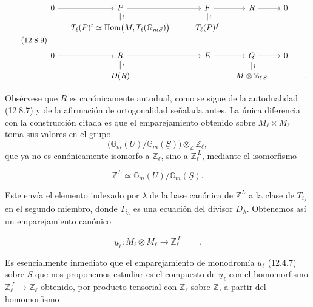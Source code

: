 
\begin{equation}\tag{12.8.9}
\begin{tikzcd}[row sep=small,column sep=small]
0 \arrow[r] & P \arrow[rr] \arrow[d,dash,"\wr"]
 & & F \arrow[r] \arrow[d,dash,"\wr"] & R \arrow[r] & 0 & \\
& T_\ell(P)^t\simeq
  \underline{\operatorname{Hom}}
    \bigl(M,T_\ell(\sisi{\underline{\mathbb G}}{\mathbb G}_{m\underline S})\sisi{}{\bigr)}
& & T_\ell(P)^f & & & \\
& & & & & & \\
0 \arrow[r] & R \arrow[rr] \arrow[d,dash,"\wr"]
& & E \arrow[r] & Q \arrow[r] \arrow[d,dash,"\wr"] & 0 & \\
& D(R) & & & M\otimes\mathbb Z_{\ell\,\underline S} & & .
\end{tikzcd}
\end{equation}

\noindent
Obsérvese que $R$ es canónicamente autodual, como se sigue de la
autodualidad (12.8.7) y de la afirmación de ortogonalidad señalada antes.
La única diferencia con la construcción citada es que el emparejamiento
obtenido sobre $M_\ell\times M_\ell$ toma sus valores en el grupo
\[
 \bigl(\mathbb G_m(U)/\mathbb G_m(\underline S)\bigr)
 \otimes_{\mathbb Z}\mathbb Z_\ell,
\]
que ya no es canónicamente isomorfo a $\mathbb Z_\ell$, sino a
$\mathbb Z_\ell^{\,L}$, mediante el isomorfismo

\begin{equation}\tag{12.8.10}
 \mathbb Z^L\simeq
 \mathbb G_m(U)/\mathbb G_m(\underline S).
\end{equation}

\noindent
Este envía el elemento indexado por $\lambda$ de la base canónica de
$\mathbb Z^L$ a la clase de $T_{i_\lambda}$ en el segundo miembro, donde
$T_{i_\lambda}$ es una ecuación del divisor $D_\lambda$. Obtenemos así
un emparejamiento canónico

\begin{equation}\tag{12.8.11}
 \underline{u}_\ell:M_\ell\otimes M_\ell
 \longrightarrow\mathbb Z_\ell^{\,L}\qquad .
\end{equation}

\noindent
Es esencialmente inmediato que el emparejamiento de monodromía $u_\ell$
(12.4.7) sobre $S$ que nos proponemos estudiar es el compuesto de
$\underline{u}_\ell$ con el homomorfismo
$\mathbb Z_\ell^{\,L}\longrightarrow\mathbb Z_\ell$ obtenido, por
producto tensorial con $\mathbb Z_\ell$ sobre $\mathbb Z$, a partir del
homomorfismo

